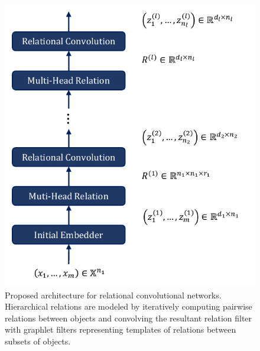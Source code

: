 \begin{figure}
    \centering
    \includegraphics[width=.5\textwidth]{figs/relconv_architecture.pdf}
    \caption{Proposed architecture for relational convolutional networks. Hierarchical relations are modeled by iteratively computing pairwise relations between objects and convolving the resultant relation filter with graphlet filters representing templates of relations between subsets of objects.}
\end{figure}

